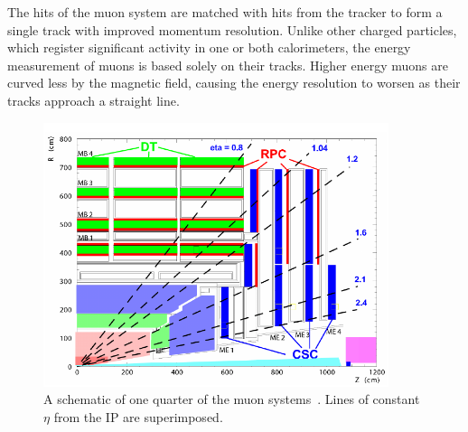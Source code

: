 The hits of the muon system are matched with hits from the tracker to form a single track with
improved momentum resolution. Unlike other charged particles, which register significant activity in
one or both calorimeters, the energy measurement of muons is based solely on their tracks.
Higher energy muons are curved less by the magnetic field,
causing the energy resolution to worsen as their tracks approach a straight line.



\begin{figure}[htbp!]
 \begin{center}
   \includegraphics[width=0.90\textwidth]{figures/experiment/muons.pdf}
      \end{center}
\caption{A schematic of one quarter of the muon systems~\cite{Chatrchyan:2008zzk}.
Lines of constant $\eta$ from the IP are superimposed.}
\label{fig:muonsystem}
\end{figure}


